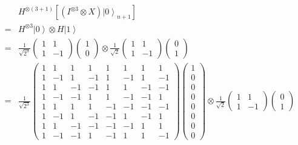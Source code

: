 \begin{frame}
\begin{exampleblock}{}
\begin{eqnarray}
&&H^{\otimes\left(3+1\right)}\left[(I^{\otimes3}\otimes X)\left.|0\right\rangle _{n+1}\right]\\&=&H^{\otimes3}\left.|0\right\rangle \otimes H\left.|1\right\rangle \\&=&\frac{1}{\sqrt{2^{3}}}\left(\begin{array}{cc}
1 & 1\\
1 & -1
\end{array}\right)\left(\begin{array}{c}
1\\
0
\end{array}\right)\otimes\frac{1}{\sqrt{2}}\left(\begin{array}{cc}
1 & 1\\
1 & -1
\end{array}\right)\left(\begin{array}{c}
0\\
1
\end{array}\right)\\&=&\frac{1}{\sqrt{2^{3}}}\left(\begin{array}{cccccccc}
1 & 1 & 1 & 1 & 1 & 1 & 1 & 1\\
1 & -1 & 1 & -1 & 1 & -1 & 1 & -1\\
1 & 1 & -1 & -1 & 1 & 1 & -1 & -1\\
1 & -1 & -1 & 1 & 1 & -1 & -1 & 1\\
1 & 1 & 1 & 1 & -1 & -1 & -1 & -1\\
1 & -1 & 1 & -1 & -1 & 1 & -1 & 1\\
1 & 1 & -1 & -1 & -1 & -1 & 1 & 1\\
1 & -1 & -1 & 1 & -1 & 1 & 1 & -1
\end{array}\right)\left(\begin{array}{c}
1\\
0\\
0\\
0\\
0\\
0\\
0\\
0
\end{array}\right)\otimes\frac{1}{\sqrt{2}}\left(\begin{array}{cc}
1 & 1\\
1 & -1
\end{array}\right)\left(\begin{array}{c}
0\\
1
\end{array}\right)\\
\end{eqnarray}
\end{exampleblock}
\end{frame}

